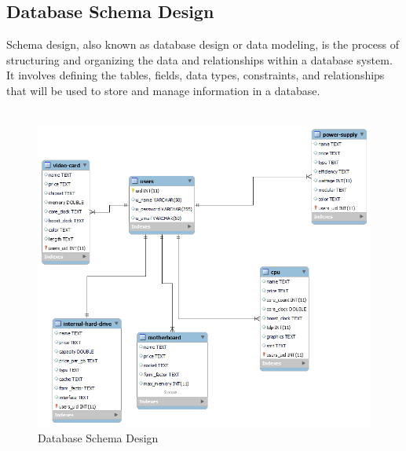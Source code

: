    \subsection{Database Schema Design}
   Schema design, also known as database design or data modeling, is the process of structuring and organizing the data and relationships within a database system. It involves defining the tables, fields, data types, constraints, and relationships that will be used to store and manage information in a database.\\\\
   \begin{figure}[H]
   \includegraphics[width=15cm]{Diagrams/schema.png}
   \caption{Database Schema Design}
   \end{figure}
